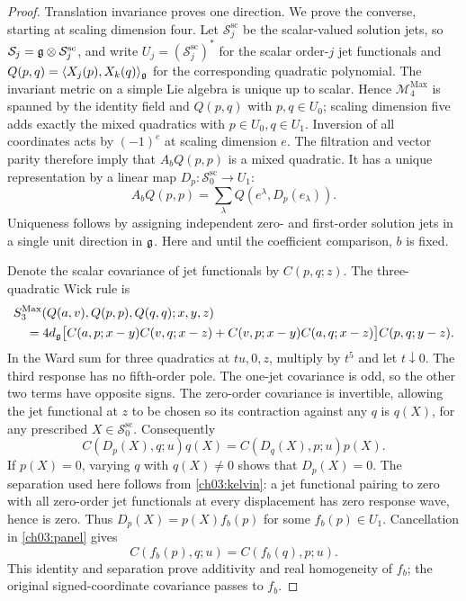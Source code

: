 \begin{proof}
Translation invariance proves one direction. We prove the converse,
starting at scaling dimension four. Let $\mathcal S_j^{\mathrm{sc}}$ be the
scalar-valued solution jets, so $\mathcal S_j=\mathfrak g\otimes
\mathcal S_j^{\mathrm{sc}}$, and write
$U_j=(\mathcal S_j^{\mathrm{sc}})^*$ for the scalar order-$j$ jet functionals and
$Q(p,q)=\langle X_j(p),X_k(q)\rangle_{\mathfrak g}$ for the corresponding
quadratic polynomial. The invariant metric on a simple Lie
algebra is unique up to scalar. Hence $\mathcal M_4^{\mathrm{Max}}$
is spanned by the identity field and $Q(p,q)$ with $p,q\in U_0$;
scaling dimension five adds exactly the mixed quadratics with $p\in U_0,q\in U_1$.
Inversion of all coordinates acts by $(-1)^e$ at scaling dimension $e$.
The filtration and vector parity therefore imply that
$A_bQ(p,p)$ is a mixed quadratic. It has a unique representation by a
linear map $D_p:\mathcal S_0^{\mathrm{sc}}\to U_1$:
\[
 A_bQ(p,p)=\sum_\lambda Q(e^\lambda,D_p(e_\lambda)).
\]
Uniqueness follows by assigning independent zero- and first-order
solution jets in a single unit direction in $\mathfrak g$. Here and until the coefficient comparison,
$b$ is fixed.

Denote the scalar covariance of jet functionals by $C(p,q;z)$.
The three-quadratic Wick rule is
\begin{align*}
&S_3^{\mathrm{Max}}(Q(a,v),Q(p,p),Q(q,q);x,y,z)\\
&\quad=4d_{\mathfrak g}\bigl[C(a,p;x-y)C(v,q;x-z)
             +C(v,p;x-y)C(a,q;x-z)\bigr]C(p,q;y-z).
\end{align*}
In the Ward sum for three quadratics at $tu,0,z$, multiply by $t^5$
and let $t\downarrow0$. The third response has no fifth-order pole.
The one-jet covariance is odd, so the other two terms have opposite
signs. The zero-order covariance is invertible, allowing the jet functional at
$z$ to be chosen so its contraction against any $q$ is $q(X)$,
for any prescribed $X\in\mathcal S_0^{\mathrm{sc}}$. Consequently
\begin{equation}\label{ch03:panel}
 C(D_p(X),q;u)q(X)=C(D_q(X),p;u)p(X).
\end{equation}
If $p(X)=0$, varying $q$ with $q(X)\ne0$ shows that $D_p(X)=0$.
The separation used here follows from \eqref{ch03:kelvin}: a jet functional
pairing to zero with all zero-order jet functionals at every displacement has
zero response wave, hence is zero. Thus
$D_p(X)=p(X)f_b(p)$ for some $f_b(p)\in U_1$.
Cancellation in \eqref{ch03:panel} gives
\[
 C(f_b(p),q;u)=C(f_b(q),p;u).
\]
This identity and separation prove additivity and real homogeneity of
$f_b$; the original signed-coordinate covariance passes to $f_b$.


\end{proof}
